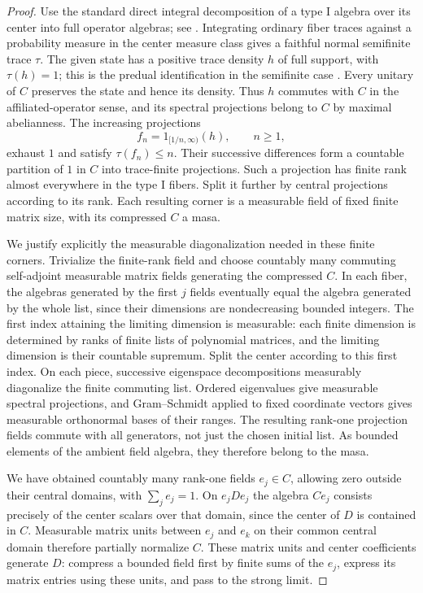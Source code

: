 \begin{proof}
Use the standard direct integral decomposition of a type I algebra
over its center into full operator algebras; see
\cite[Sections~6.6 and 14.1--14.2]{KR86}.
Integrating ordinary fiber traces against a probability measure in the
center measure class gives a faithful normal semifinite trace $\tau$.
The given state has a positive trace density $h$ of full support, with
$\tau(h)=1$; this is the predual identification in the semifinite case
\cite[Proposition~1.5 and Theorem~2.1]{Haa79}.
Every unitary of $C$ preserves the state and hence its
density.  Thus $h$ commutes with $C$ in the affiliated-operator sense,
and its spectral projections belong to $C$ by maximal abelianness.
The increasing projections
\[
 f_n=1_{[1/n,\infty)}(h),\qquad n\geq1,
\]
exhaust $1$ and satisfy $\tau(f_n)\leq n$.  Their successive
differences form a countable partition of $1$ in $C$ into trace-finite
projections.  Such a projection has finite rank almost everywhere in
the type I fibers.  Split it further by central projections according
to its rank.  Each resulting corner is a measurable field of fixed
finite matrix size, with its compressed $C$ a masa.

We justify explicitly the measurable diagonalization needed in these
finite corners.  Trivialize the finite-rank field and choose countably
many commuting self-adjoint measurable matrix fields generating the
compressed $C$.  In each fiber, the algebras generated by the first
$j$ fields eventually equal the algebra generated by the whole list,
since their dimensions are nondecreasing bounded integers.  The first
index attaining the limiting dimension is measurable: each finite
dimension is determined by ranks of finite lists of polynomial
matrices, and the limiting dimension is their countable supremum.
Split the center according to this first index.  On each piece,
successive eigenspace decompositions measurably diagonalize the finite
commuting list.  Ordered eigenvalues give measurable spectral
projections, and Gram--Schmidt applied to fixed coordinate vectors
gives measurable orthonormal bases of their ranges.  The resulting
rank-one projection fields commute with all generators, not just the
chosen initial list.  As bounded elements of the ambient field
algebra, they therefore belong to the masa.

We have obtained countably many rank-one fields $e_j\in C$, allowing
zero outside their central domains, with $\sum_j e_j=1$.
On $e_jDe_j$ the algebra $Ce_j$ consists precisely of the center
scalars over that domain, since the center of $D$ is contained in
$C$.  Measurable matrix units between $e_j$ and $e_k$ on their common
central domain therefore partially normalize $C$.  These matrix
units and center coefficients generate $D$: compress a bounded field
first by finite sums of the $e_j$, express its matrix entries using
these units, and pass to the strong limit.


\end{proof}
